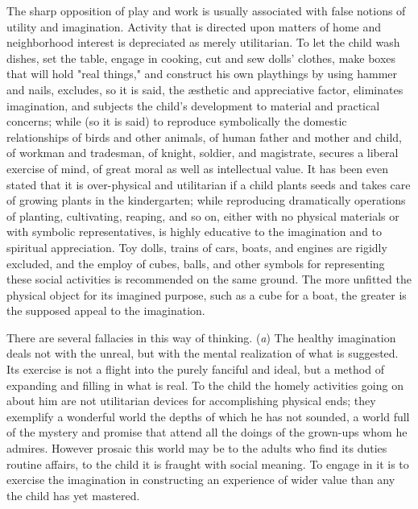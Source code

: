 \documentclass[letterpaper]{book}
\begin{document}

The sharp opposition of play and work is usually associated with false
notions of utility and imagination. Activity that is directed upon
matters of home and neighborhood interest is depreciated as merely
utilitarian. To let the child wash dishes, set the table, engage in
cooking, cut and sew dolls' clothes, make boxes that will hold "real
things," and construct his own playthings by using hammer and nails,
excludes, so it is said, the æsthetic and appreciative factor,
eliminates imagination, and subjects the child's development to material
and practical concerns; while (so it is said) to reproduce symbolically
the domestic relationships of birds and other animals, of human father
and mother and child, of workman and tradesman, of knight, soldier, and
magistrate, secures a liberal exercise of mind, of great moral as well
as intellectual value. It has been even stated that it is over-physical
and utilitarian if a child plants seeds and takes care of growing plants
in the kindergarten; while reproducing dramatically operations of
planting, cultivating, reaping, and so on,
either
with no physical materials or with symbolic representatives, is highly
educative to the imagination and to spiritual appreciation. Toy dolls,
trains of cars, boats, and engines are rigidly excluded, and the employ
of cubes, balls, and other symbols for representing these social
activities is recommended on the same ground. The more unfitted the
physical object for its imagined purpose, such as a cube for a boat, the
greater is the supposed appeal to the imagination.


There are several fallacies in this way of thinking. (\emph{a}) The
healthy imagination deals not with the unreal, but with the mental
realization of what is suggested. Its exercise is not a flight into the
purely fanciful and ideal, but a method of expanding and filling in what
is real. To the child the homely activities going on about him are not
utilitarian devices for accomplishing physical ends; they exemplify a
wonderful world the depths of which he has not sounded, a world full of
the mystery and promise that attend all the doings of the grown-ups whom
he admires. However prosaic this world may be to the adults who find its
duties routine affairs, to the child it is fraught with social meaning.
To engage in it is to exercise the imagination in constructing an
experience of wider value than any the child has yet mastered.
\end{document}
